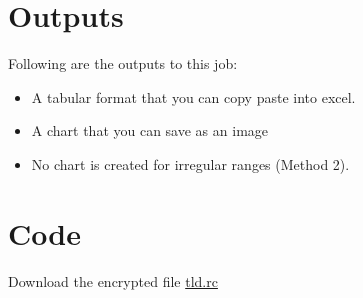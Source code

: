 \documentclass[
  letterpaper,
  DIV=11,
  numbers=noendperiod]{scrreprt}
\newenvironment{Shaded}{\begin{snugshade}}{\end{snugshade}}
\newcommand{\CommentTok}[1]{\textcolor[rgb]{0.37,0.37,0.37}{#1}}
\newcommand{\DecValTok}[1]{\textcolor[rgb]{0.68,0.00,0.00}{#1}}
\newcommand{\KeywordTok}[1]{\textcolor[rgb]{0.00,0.23,0.31}{\textbf{#1}}}
\newcommand{\NormalTok}[1]{\textcolor[rgb]{0.00,0.23,0.31}{#1}}
\newcommand{\OperatorTok}[1]{\textcolor[rgb]{0.37,0.37,0.37}{#1}}
\newcommand{\VariableTok}[1]{\textcolor[rgb]{0.07,0.07,0.07}{#1}}
\begin{document}
\begin{Shaded}
\end{Shaded}

\section{Outputs}\label{outputs-8}

Following are the outputs to this job:

\begin{itemize}
\item
  A tabular format that you can copy paste into excel.
\item
  A chart that you can save as an image
\item
  No chart is created for irregular ranges (Method 2).
\end{itemize}

\section{Code}\label{code-8}

Download the encrypted file \href{./tld.rc}{tld.rc}
\end{document}
